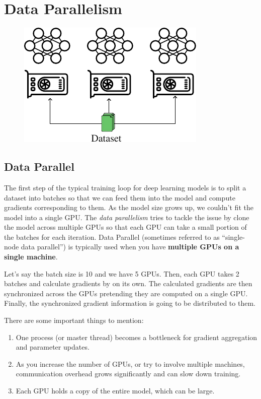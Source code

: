 \chapter{Data Parallelism}

\begin{figure}[t]
	\centering
	\includegraphics[scale=1.5]{./images/data_parallel.pdf}
\end{figure}

\section{Data Parallel}
\label{sec:parallelism:data_parallelism:dp}

The first step of the typical training loop for deep learning models is to split a dataset into batches so that we can feed them into the model and compute gradients corresponding to them. As the model size grows up, we couldn't fit the model into a single GPU. The \textit{data parallelism} tries to tackle the issue by clone the model across multiple GPUs so that each GPU can take a small portion of the batches for each iteration. Data Parallel (sometimes referred to as ``single-node data parallel'') is typically used when you have \textbf{multiple GPUs on a single machine}. 

Let's say the batch size is 10 and we have 5 GPUs. Then, each GPU takes 2 batches and calculate gradients by on its own. The calculated gradients are then synchronized across the GPUs pretending they are computed on a single GPU. Finally, the synchronized gradient information is going to be distributed to them. 

There are some important things to mention: 
\begin{enumerate}
	\item One process (or master thread) becomes a bottleneck for gradient aggregation and parameter updates.
	\item As you increase the number of GPUs, or try to involve multiple machines, communication overhead grows significantly and can slow down training.
	\item Each GPU holds a copy of the entire model, which can be large.
\end{enumerate}

